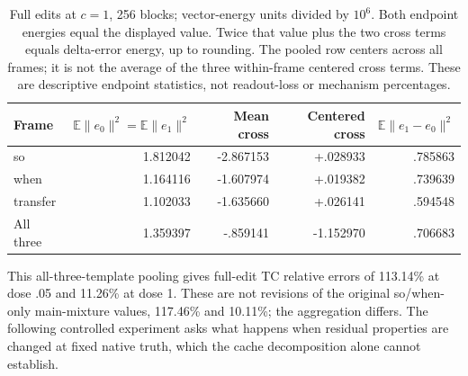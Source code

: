 \begin{table}[ht]\centering\small
\begin{tabular}{lrrrr}\toprule
Frame & $\mathbb{E}\|e_0\|^2=\mathbb{E}\|e_1\|^2$ & Mean cross & Centered cross & $\mathbb{E}\|e_1-e_0\|^2$\\\midrule
so & 1.812042 & -2.867153 & +.028933 & .785863\\
when & 1.164116 & -1.607974 & +.019382 & .739639\\
transfer & 1.102033 & -1.635660 & +.026141 & .594548\\
All three & 1.359397 & -.859141 & -1.152970 & .706683\\\bottomrule
\end{tabular}
\caption{Full edits at $c=1$, 256 blocks; vector-energy units divided by $10^6$. Both endpoint energies equal the displayed value. Twice that value plus the two cross terms equals delta-error energy, up to rounding. The pooled row centers across all frames; it is not the average of the three within-frame centered cross terms. These are descriptive endpoint statistics, not readout-loss or mechanism percentages.}\label{tab:centering}
\end{table}

This all-three-template pooling gives full-edit TC relative errors of 113.14\% at dose .05 and 11.26\% at dose 1. These are not revisions of the original so/when-only main-mixture values, 117.46\% and 10.11\%; the aggregation differs. The following controlled experiment asks what happens when residual properties are changed at fixed native truth, which the cache decomposition alone cannot establish.
